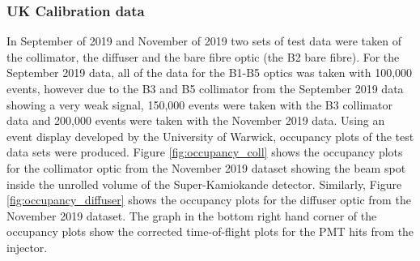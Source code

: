 \subsubsection{UK Calibration data}

In September of 2019 and November of 2019 two sets of test data were taken of the collimator, the diffuser and the bare fibre optic (the B2 bare fibre). For the September 2019 data, all of the data for the B1-B5 optics was taken with 100,000 events, however due to the B3 and B5 collimator from the September 2019 data showing a very weak signal, 150,000 events were taken with the B3 collimator data and 200,000 events were taken with the November 2019 data. Using an event display developed by the University of Warwick, occupancy plots of the test data sets were produced. Figure \ref{fig:occupancy_coll} shows the occupancy plots for the collimator optic from the November 2019 dataset showing the beam spot inside the unrolled volume of the Super-Kamiokande detector. Similarly, Figure \ref{fig:occupancy_diffuser} shows the occupancy plots for the diffuser optic from the November 2019 dataset. The graph in the bottom right hand corner of the occupancy plots show the corrected time-of-flight plots for the PMT hits from the injector. 

